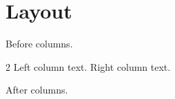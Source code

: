 \documentclass[12pt,a4paper]{article}
\begin{document}
\section{Layout}
Before columns.
\begin{multicols}{2}
Left column text.
\columnbreak
Right column text.
\end{multicols}
After columns.
\end{document}

